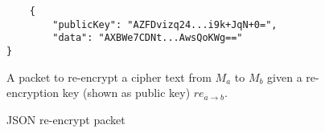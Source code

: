 \begin{figure}[H]
  \centering
  \begin{verbatim}
	{
		"publicKey": "AZFDvizq24...i9k+JqN+0=",
		"data": "AXBWe7CDNt...AwsQoKWg=="
}
  \end{verbatim}
  \caption{
  	JSON re-encrypt packet
  }{
  	A packet to re-encrypt a cipher text from $M_a$ to $M_b$ given a re-encryption key (shown as public key) $re_{a \rightarrow b}$.
  }
  \label{code:reencrypt_data_json}
\end{figure}
